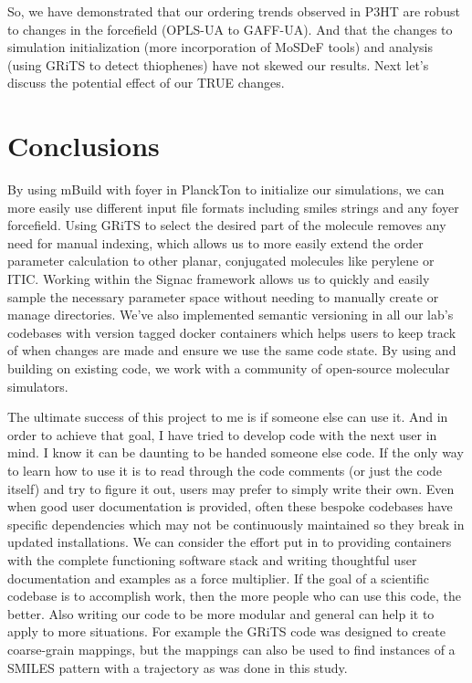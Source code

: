So, we have demonstrated that our ordering trends observed in P3HT are robust to changes in the forcefield (OPLS-UA to GAFF-UA). And that the changes to simulation initialization (more incorporation of MoSDeF tools) and analysis (using GRiTS to detect thiophenes) have not skewed our results. Next let's discuss the potential effect of our TRUE changes.

\section{Conclusions}

By using  mBuild with foyer in PlanckTon to initialize our simulations, we can more easily use different input file formats including smiles strings and any foyer forcefield. 
Using GRiTS to select the desired part of the molecule removes any need for manual indexing, which allows us to more easily extend the order parameter calculation to other planar, conjugated molecules like perylene or ITIC.
Working within the Signac framework allows us to quickly and easily sample the necessary parameter space without needing to manually create or manage directories. 
We've also implemented semantic versioning in all our lab's codebases with version tagged docker containers which helps users to keep track of when changes are made and ensure we use the same code state.
By using and building on existing code, we work with a community of open-source molecular simulators. 

The ultimate success of this project to me is if someone else can use it. 
And in order to achieve that goal, I have tried to develop code with the next user in mind.
I know it can be daunting to be handed someone else code. 
If the only way to learn how to use it is to read through the code comments (or just the code itself) and try to figure it out, users may prefer to simply write their own. 
Even when good user documentation is provided, often these bespoke codebases have specific dependencies which may not be continuously maintained so they break in updated installations.
We can consider the effort put in to providing containers with the complete functioning software stack and writing thoughtful user documentation and examples as a force multiplier. 
If the goal of a scientific codebase is to accomplish work, then the more people who can use this code, the better.
Also writing our code to be more modular and general can help it to apply to more situations. 
For example the GRiTS code was designed to create coarse-grain mappings, but the mappings can also be used to find instances of a SMILES pattern with a trajectory as was done in this study.

